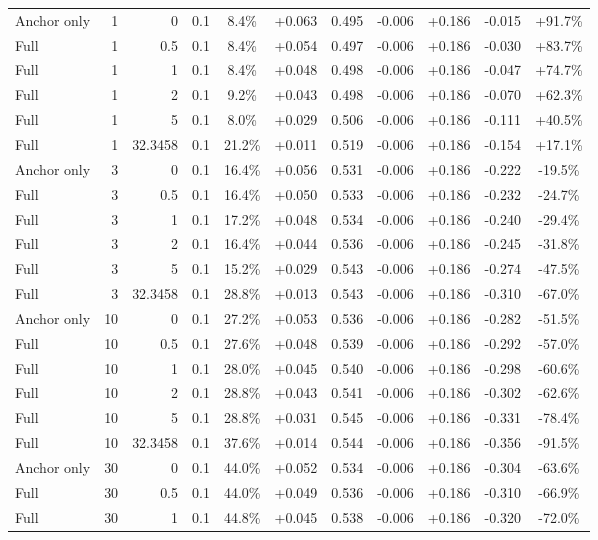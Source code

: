 \begin{table}[htbp]
\begin{tabular}{lrrrccccccc}
Anchor only & 1 & 0 & 0.1 & 8.4\% & +0.063 & 0.495 & -0.006 & +0.186 & -0.015 & +91.7\% \\
Full & 1 & 0.5 & 0.1 & 8.4\% & +0.054 & 0.497 & -0.006 & +0.186 & -0.030 & +83.7\% \\
Full & 1 & 1 & 0.1 & 8.4\% & +0.048 & 0.498 & -0.006 & +0.186 & -0.047 & +74.7\% \\
Full & 1 & 2 & 0.1 & 9.2\% & +0.043 & 0.498 & -0.006 & +0.186 & -0.070 & +62.3\% \\
Full & 1 & 5 & 0.1 & 8.0\% & +0.029 & 0.506 & -0.006 & +0.186 & -0.111 & +40.5\% \\
Full & 1 & 32.3458 & 0.1 & 21.2\% & +0.011 & 0.519 & -0.006 & +0.186 & -0.154 & +17.1\% \\
Anchor only & 3 & 0 & 0.1 & 16.4\% & +0.056 & 0.531 & -0.006 & +0.186 & -0.222 & -19.5\% \\
Full & 3 & 0.5 & 0.1 & 16.4\% & +0.050 & 0.533 & -0.006 & +0.186 & -0.232 & -24.7\% \\
Full & 3 & 1 & 0.1 & 17.2\% & +0.048 & 0.534 & -0.006 & +0.186 & -0.240 & -29.4\% \\
Full & 3 & 2 & 0.1 & 16.4\% & +0.044 & 0.536 & -0.006 & +0.186 & -0.245 & -31.8\% \\
Full & 3 & 5 & 0.1 & 15.2\% & +0.029 & 0.543 & -0.006 & +0.186 & -0.274 & -47.5\% \\
Full & 3 & 32.3458 & 0.1 & 28.8\% & +0.013 & 0.543 & -0.006 & +0.186 & -0.310 & -67.0\% \\
Anchor only & 10 & 0 & 0.1 & 27.2\% & +0.053 & 0.536 & -0.006 & +0.186 & -0.282 & -51.5\% \\
Full & 10 & 0.5 & 0.1 & 27.6\% & +0.048 & 0.539 & -0.006 & +0.186 & -0.292 & -57.0\% \\
Full & 10 & 1 & 0.1 & 28.0\% & +0.045 & 0.540 & -0.006 & +0.186 & -0.298 & -60.6\% \\
Full & 10 & 2 & 0.1 & 28.8\% & +0.043 & 0.541 & -0.006 & +0.186 & -0.302 & -62.6\% \\
Full & 10 & 5 & 0.1 & 28.8\% & +0.031 & 0.545 & -0.006 & +0.186 & -0.331 & -78.4\% \\
Full & 10 & 32.3458 & 0.1 & 37.6\% & +0.014 & 0.544 & -0.006 & +0.186 & -0.356 & -91.5\% \\
Anchor only & 30 & 0 & 0.1 & 44.0\% & +0.052 & 0.534 & -0.006 & +0.186 & -0.304 & -63.6\% \\
Full & 30 & 0.5 & 0.1 & 44.0\% & +0.049 & 0.536 & -0.006 & +0.186 & -0.310 & -66.9\% \\
Full & 30 & 1 & 0.1 & 44.8\% & +0.045 & 0.538 & -0.006 & +0.186 & -0.320 & -72.0\% \\

\end{tabular}
\end{table}
